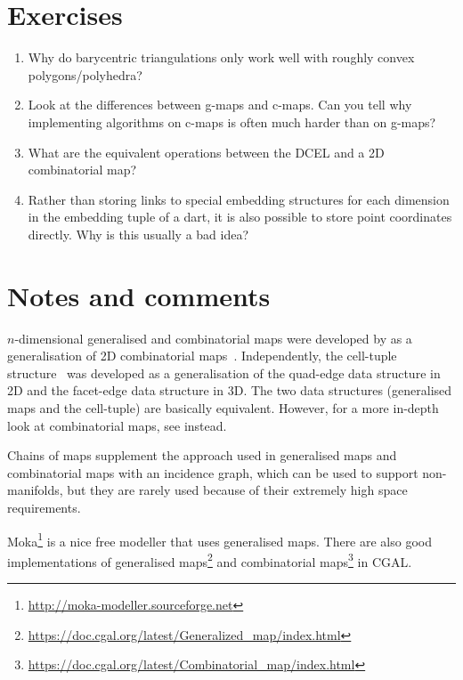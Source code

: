 %
\section{Exercises}

\begin{enumerate}
	\item Why do barycentric triangulations only work well with roughly convex polygons/polyhedra?
	\item Look at the differences between g-maps and c-maps. Can you tell why implementing algorithms on c-maps is often much harder than on g-maps?
	\item What are the equivalent operations between the DCEL and a 2D combinatorial map?
	\item Rather than storing links to special embedding structures for each dimension in the embedding tuple of a dart, it is also possible to store point coordinates directly. Why is this usually a bad idea?
\end{enumerate}



%
\section{Notes and comments}

\(n\)-dimensional generalised and combinatorial maps were developed by \citet{Lienhardt94} as a generalisation of 2D combinatorial maps~\citep{Edmonds60}.
Independently, the cell-tuple structure~\citep{Brisson89} was developed as a generalisation of the quad-edge \citep{Guibas85} data structure in 2D and the facet-edge data structure \citep{Dobkin87} in 3D.
The two data structures (generalised maps and the cell-tuple) are basically equivalent.
However, for a more in-depth look at combinatorial maps, see \citet{Damiand14} instead.

Chains of maps \citep{Elter94} supplement the approach used in generalised maps and combinatorial maps with an incidence graph, which can be used to support non-manifolds, but they are rarely used because of their extremely high space requirements.

Moka\footnote{\url{http://moka-modeller.sourceforge.net}} is a nice free modeller that uses generalised maps.
There are also good implementations of generalised maps\footnote{\url{https://doc.cgal.org/latest/Generalized_map/index.html}} and combinatorial maps\footnote{\url{https://doc.cgal.org/latest/Combinatorial_map/index.html}} in CGAL\@.

